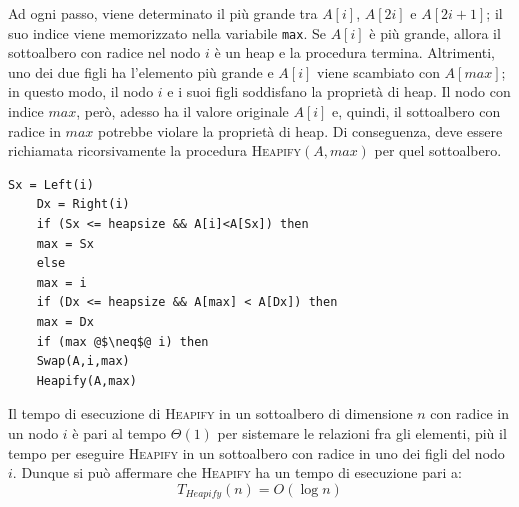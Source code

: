 \begin{center}
	\begin{minipage}{\textwidth}
		\centering
		\label{fig:heapify}
	\end{minipage}
\end{center}

Ad ogni passo, viene determinato il più grande tra $A[i]$, $A[2i]$ e $A[2i+1]$; il suo indice viene memorizzato nella variabile \texttt{max}. Se $A[i]$ è più grande, allora il sottoalbero con radice nel nodo $i$ è un heap e la procedura termina. Altrimenti, uno dei due figli ha l'elemento più grande e $A[i]$ viene scambiato con $A[max]$; in questo modo, il nodo $i$ e i suoi figli soddisfano la proprietà di heap. Il nodo con indice $max$, però, adesso ha il valore originale $A[i]$ e, quindi, il sottoalbero con radice in $max$ potrebbe violare la proprietà di heap. Di conseguenza, deve essere richiamata ricorsivamente la procedura \textsc{Heapify}$(A,max)$ per quel sottoalbero.

\begin{lstlisting}[language=asd,caption={\textsc{Heapify}(A,i)},label=alg:heapify]
	Sx = Left(i)
	Dx = Right(i)
	if (Sx <= heapsize && A[i]<A[Sx]) then
	max = Sx
	else
	max = i
	if (Dx <= heapsize && A[max] < A[Dx]) then
	max = Dx
	if (max @$\neq$@ i) then
	Swap(A,i,max)
	Heapify(A,max)
\end{lstlisting}

Il tempo di esecuzione di \textsc{Heapify} in un sottoalbero di dimensione $n$  con radice in un nodo $i$ è pari al tempo $\Theta(1)$ per sistemare le relazioni fra gli elementi, più il tempo per eseguire \textsc{Heapify} in un sottoalbero con radice in uno dei figli del nodo $i$. Dunque si può affermare che \textsc{Heapify} ha un tempo di esecuzione pari a:
\begin{equation}T_{Heapify}(n) = O(\log n)\end{equation}

